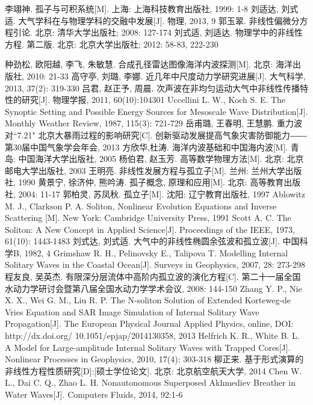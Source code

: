 ﻿%
\cleardoublepage
{}
{}
\nocite{*}
%

\begin{thebibliography}{0}
 李翊神. 孤子与可积系统[M]. 上海: 上海科技教育出版社, 1999: 1-8
 刘适达, 刘式适. 大气学科在与物理学科的交融中发展[J]. 物理, 2013, 9
 郭玉翠. 非线性偏微分方程引论. 北京: 清华大学出版社; 2008: 127-174
 刘式适, 刘适达. 物理学中的非线性方程. 第二版. 北京: 北京大学出版社; 2012: 58-83, 222-230

 种劲松, 欧阳越, 李飞, 朱敏慧. 合成孔径雷达图像海洋内波探测[M]. 北京: 海洋出版社, 2010: 21-33
 高守亭, 刘璐, 李娜. 近几年中尺度动力学研究进展[J]. 大气科学, 2013, 37(2): 319-330
 吕君, 赵正予, 周晨. 次声波在非均匀运动大气中非线性传播特性的研究[J]. 物理学报,  2011, 60(10):104301
 Uccellini L. W., Koch S. E. The Synoptic Setting and Possible Energy Sources for Mesoscale Wave Distribution[J]. Monthly Weather Review, 1987, 115(3): 721-729
 岳甫璐, 王春明, 王慧鹏. 重力波对``7.21" 北京大暴雨过程的影响研究[C]. 创新驱动发展提高气象灾害防御能力―― 第30届中国气象学会年会, 2013
 方欣华,杜涛. 海洋内波基础和中国海内波[M]. 青岛: 中国海洋大学出版社, 2005
 杨伯君, 赵玉芳. 高等数学物理方法[M]. 北京: 北京邮电大学出版社, 2003
 王明亮. 非线性发展方程与孤立子[M]. 兰州: 兰州大学出版社, 1990
 黄景宁, 徐济仲, 熊吟涛. 孤子概念, 原理和应用[M]. 北京: 高等教育出版社, 2004: 11-17
 郭柏灵, 苏凤秋. 孤立子[M]. 沈阳: 辽宁教育出版社, 1997
 Ablowitz M. J., Clarkson P. A. Soliton, Nonlinear Evolution Equations and Inverse Scattering [M]. New York: Cambridge University Press, 1991
  Scott A. C. The Soliton: A New Concept in Applied Science[J]. Proceedings of the IEEE, 1973,  61(10): 1443-1483
 刘式达, 刘式适. 大气中的非线性椭圆余弦波和孤立波[J]. 中国科学B, 1982, 4
  Grimshaw R. H., Pelinovsky E., Talipova T. Modelling Internal Solitary Waves in the Coastal Ocean[J].  Surveys in Geophysics, 2007,  28: 273-298
 程友良, 吴英杰. 有限深分层流体中高阶内孤立波的演化方程[C]. 第二十一届全国水动力学研讨会暨第八届全国水动力学学术会议,  2008: 144-150
 Zhang Y. P., Nie X. X., Wei G. M., Liu R. P. The N-soliton Solution of Extended Korteweg-de Vries Equation and SAR Image Simulation of Internal Solitary Wave Propagation[J]. The  European  Physical  Journal  Applied  Physics,  online, DOI: http://dx.doi.org/ 10.1051/epjap/2014130358,  2013
  Helfrich K. R., White B. L. A Model for Large-amplitude Internal Solitary Waves with Trapped Cores[J]. Nonlinear Processes in Geophysics, 2010, 17(4): 303-318
 柳正来. 基于形式演算的非线性方程性质研究[D]:[硕士学位论文]. 北京: 北京航空航天大学, 2014
 Chen W. L., Dai C. Q., Zhao L. H. Nonautonomous Superposed Akhmediev Breather in Water Waves[J]. Computers Fluids, 2014, 92:1-6


\end{thebibliography}
